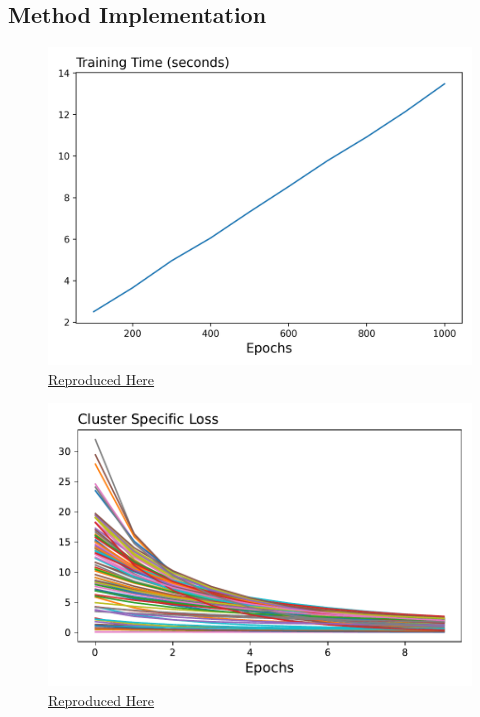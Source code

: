 \documentclass[a4paper,12pt]{article}
\begin{document}
\subsection{Method Implementation}
\begin{figure}[htbp]
\centering
\includegraphics[width=.5\linewidth]{figures/framework/method_time.png}
\caption{ \href{https://github.com/pharringtonp19/evictions/blob/main/scripts/method/time_train_plot.py}{Reproduced Here}}
\label{FIGURE LABEL}
\end{figure}

\begin{figure}[htbp]
\centering
\includegraphics[width=.5\linewidth]{figures/framework/inner_loop_0.pdf}
\caption{ \href{https://github.com/pharringtonp19/evictions/blob/main/scripts/cceh/primary/diff_n_mean_rrh.py}{Reproduced Here}}
\label{FIGURE LABEL}
\end{figure}
\end{document}

